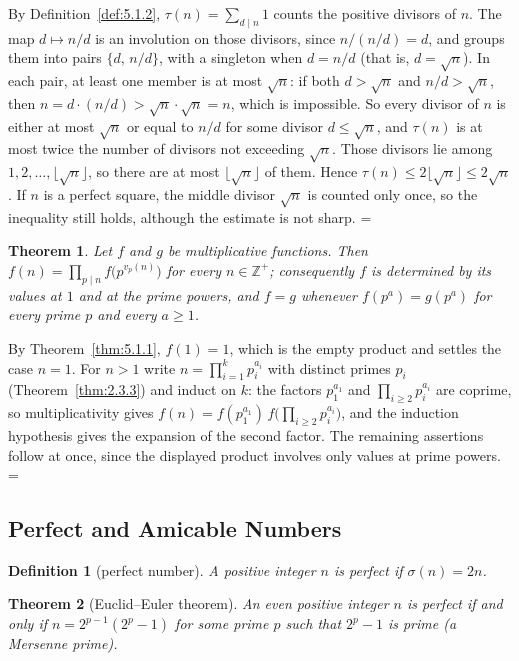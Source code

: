 \documentclass[11pt]{article}
\makeatletter
\theoremstyle{ntstyle}
\newtheorem{theorem}{Theorem}[subsection]
\newtheorem{definition}{Definition}[subsection]
\let\nt@closedisplay\]
\def\nt@guardedclose{\@ifnextchar\par{\nt@closeafterpar}{\@ifnextchar\end{\postdisplaypenalty\@M\nt@closedisplay}{\nt@closedisplay}}}
\def\nt@closeafterpar\par{\@ifnextchar\par{\nt@closeafterpar}{\@ifnextchar\end{\postdisplaypenalty\@M\nt@closedisplay\par}{\nt@closedisplay\par}}}
\renewenvironment{proof}[1][\proofname]{\par
  \pushQED{\qed}\normalfont\topsep\medskipamount\edef\nt@afterproof{\@endparpenalty=\the\@endparpenalty\relax}\@beginparpenalty\@M\@endparpenalty\@M\let\]\nt@guardedclose\trivlist\item[]\textit{#1\@addpunct{.}} \ignorespaces}{\ifvmode\addpenalty\@M\fi\popQED\nt@afterproof\endtrivlist\@endpefalse}
\makeatother
\begin{document}
\begin{proof} By Definition~\ref{def:5.1.2}, $\tau(n)=\sum_{d\mid n}1$
	counts the positive divisors of $n$. The map
	$d\mapsto n/d$ is an involution on those divisors, since $n/(n/d)=d$,
	and groups them into
	pairs $\{d,\,n/d\}$, with a singleton when $d=n/d$ (that is, $d=\sqrt{n}$).
	In each pair, at least one member is
	at most $\sqrt{n}$: if both $d>\sqrt{n}$ and $n/d>\sqrt{n}$, then $n=d\cdot(n/d)>\sqrt{n}\cdot\sqrt{n}=n$,
	which is impossible. So every divisor of $n$ is either at most $\sqrt{n}$ or
	equal to $n/d$ for some divisor $d\le\sqrt{n}$, and $\tau(n)$ is at most twice the number of
	divisors not exceeding $\sqrt{n}$. Those divisors lie among $1,2,\ldots,\lfloor\sqrt{n}\rfloor$,
	so there are at most $\lfloor\sqrt{n}\rfloor$ of them.
	Hence $\tau(n)\le 2\lfloor\sqrt{n}\rfloor\le 2\sqrt{n}$. If $n$
	is a perfect square, the middle divisor $\sqrt n$ is counted only once,
	so the inequality still holds, although the estimate is not sharp.
\end{proof}
\begin{theorem}\label{thm:5.1.10} Let $f$ and $g$ be multiplicative
	functions. Then $f(n)=\prod_{p\mid n}f\bigl(p^{v_p(n)}\bigr)$ for every
	$n\in\mathbb{Z}^+$; consequently $f$ is determined by its values at $1$ and
	at the prime powers, and $f=g$ whenever $f(p^{a})=g(p^{a})$ for every prime $p$ and every $a\ge1$.
\end{theorem}

\begin{proof} By Theorem~\ref{thm:5.1.1}, $f(1)=1$, which is the
	empty product and settles the case $n=1$. For $n>1$ write
	$n=\prod_{i=1}^{k}p_i^{a_i}$ with distinct primes $p_i$
	(Theorem~\ref{thm:2.3.3}) and induct on $k$: the factors $p_1^{a_1}$ and
	$\prod_{i\ge2}p_i^{a_i}$ are coprime, so multiplicativity gives
	$f(n)=f(p_1^{a_1})\,f\big(\prod_{i\ge2}p_i^{a_i}\big)$, and the induction
	hypothesis gives the expansion of the second factor. The remaining assertions follow at
	once, since the displayed product involves only values at prime powers.
\end{proof}
\subsection{Perfect and Amicable Numbers}

\begin{definition}[perfect number]\label{def:5.2.1}
	A positive integer $n$ is perfect if $\sigma(n) = 2n$.
\end{definition}
\begin{theorem}[Euclid--Euler theorem]\label{thm:5.2.1} An even positive integer
	$n$ is perfect if and only if
	$n = 2^{p-1}(2^{p}-1)$ for some prime $p$ such that $2^{p}-1$ is prime (a Mersenne prime).
\end{theorem}
\end{document}
